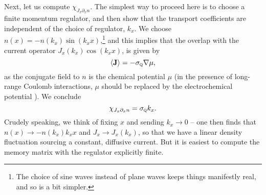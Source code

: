 \documentclass[10pt, oneside]{book}
\begin{document}
\begin{doublespace}
Next, let us compute $\chi_{J_x \partial_x n}$.   The simplest way to proceed here is to choose a finite momentum regulator, and then show that the transport coefficients are independent of the choice of regulator, $k_x$.    We choose $n(x) =  -n(k_x)\sin(k_xx)$,\footnote{The choice of sine waves instead of plane waves keeps things manifestly real, and so is a bit simpler.} and this implies that the overlap with the current operator $J_x(k_x)\cos(k_xx)$, is given by \begin{equation}
\langle \mathbf{J} \rangle = -\sigma_{\textsc{q}} \nabla \mu,  \label{jmu}
\end{equation}as the conjugate field to $n$ is the chemical potential $\mu$ (in the presence of long-range Coulomb interactions, $\mu$ should be
replaced by the electrochemical potential \cite{pines,godby}).   
We conclude\begin{equation}
\chi_{J_x \partial_x n} = \sigma_{\textsc{q}} k_x.
\end{equation}
Crudely speaking, we think of fixing $x$ and sending $k_x\rightarrow 0$ -- one then finds that $n(x) \rightarrow -n(k_x)k_xx$ and $J_x \rightarrow J_x(k_x)$, so that we have a linear density fluctuation sourcing a constant, diffusive current.   But it is easiest to compute the memory matrix with the regulator explicitly finite.


\end{doublespace}
\end{document}
